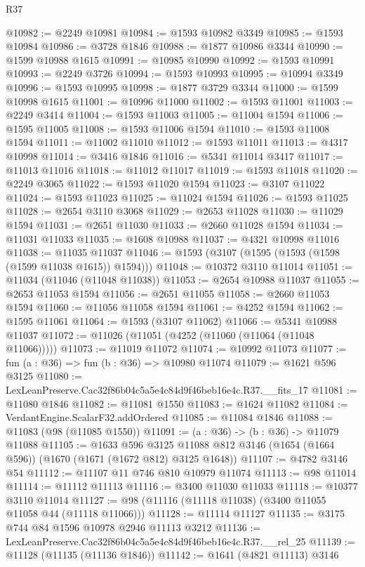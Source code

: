 \begin{lexlean}{R37}
\begin{coremodule}
@10982 := @2249 @10981
@10984 := @1593 @10982 @3349
@10985 := @1593 @10984
@10986 := @3728 @1846
@10988 := @1877 @10986 @3344
@10990 := @1599 @10988 @1615
@10991 := @10985 @10990
@10992 := @1593 @10991
@10993 := @2249 @3726
@10994 := @1593 @10993
@10995 := @10994 @3349
@10996 := @1593 @10995
@10998 := @1877 @3729 @3344
@11000 := @1599 @10998 @1615
@11001 := @10996 @11000
@11002 := @1593 @11001
@11003 := @2249 @3414
@11004 := @1593 @11003
@11005 := @11004 @1594
@11006 := @1595 @11005
@11008 := @1593 @11006 @1594
@11010 := @1593 @11008 @1594
@11011 := @11002 @11010
@11012 := @1593 @11011
@11013 := @4317 @10998
@11014 := @3416 @1846
@11016 := @5341 @11014 @3417
@11017 := @11013 @11016
@11018 := @11012 @11017
@11019 := @1593 @11018
@11020 := @2249 @3065
@11022 := @1593 @11020 @1594
@11023 := @3107 @11022
@11024 := @1593 @11023
@11025 := @11024 @1594
@11026 := @1593 @11025
@11028 := @2654 @3110 @3068
@11029 := @2653 @11028
@11030 := @11029 @1594
@11031 := @2651 @11030
@11033 := @2660 @11028 @1594
@11034 := @11031 @11033
@11035 := @1608 @10988
@11037 := @4321 @10998 @11016
@11038 := @11035 @11037
@11046 := @1593 (@3107 (@1595 (@1593 (@1598 (@1599 @11038 @1615)) @1594)))
@11048 := @10372 @3110 @11014
@11051 := @11034 (@11046 (@11048 @11038))
@11053 := @2654 @10988 @11037
@11055 := @2653 @11053 @1594
@11056 := @2651 @11055
@11058 := @2660 @11053 @1594
@11060 := @11056 @11058 @1594
@11061 := @4252 @1594
@11062 := @1595 @11061
@11064 := @1593 (@3107 @11062)
@11066 := @5341 @10988 @11037
@11072 := @11026 (@11051 (@4252 (@11060 (@11064 (@11048 @11066)))))
@11073 := @11019 @11072
@11074 := @10992 @11073
@11077 := fun (a : @36) => fun (b : @36) => @10980 @11074
@11079 := @1621 @596 @3125
@11080 := LexLeanPreserve.Cac32f86b04c5a5e4c84d9f46beb16e4c.R37.__fits_17
@11081 := @11080 @1846
@11082 := @11081 @1550
@11083 := @1624 @11082
@11084 := VerdantEngine.ScalarF32.addOrdered
@11085 := @11084 @1846
@11088 := @11083 (@98 (@11085 @1550))
@11091 := (a : @36) -> (b : @36) -> @11079 @11088
@11105 := @1633
    @596
    @3125
    @11088
    @812
    @3146
    (@1654 (@1664 @596))
    (@1670 (@1671 (@1672 @812) @3125 @1648))
@11107 := @4782 @3146 @54
@11112 := @11107 @11 @746 @810 @10979 @11074
@11113 := @98 @11014
@11114 := @11112 @11113
@11116 := @3400 @11030 @11033
@11118 := @10377 @3110 @11014
@11127 := @98 (@11116 (@11118 @11038) (@3400 @11055 @11058 @44 (@11118 @11066)))
@11128 := @11114 @11127
@11135 := @3175 @744 @84 @1596 @10978 @2946 @11113 @3212
@11136 := LexLeanPreserve.Cac32f86b04c5a5e4c84d9f46beb16e4c.R37.__rel_25
@11139 := @11128 (@11135 (@11136 @1846))
@11142 := @1641 (@4821 @11113) @3146

\end{coremodule}
\end{lexlean}
